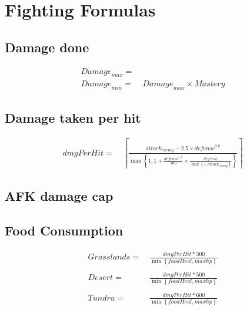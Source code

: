     \newpage
    \section{Fighting Formulas}
        \subsection{Damage done}
            \begin{align*}
                {Damage}_{max} =&\
                \\
                {Damage}_{min} =&\ {Damage}_{max} \times Mastery
            \end{align*}
        \subsection{Damage taken per hit}
            \begin{align*}
                dmgPerHit = &\
                    \left\lceil
                    \frac{ {attack}_{enemy} - 2.5 \times {defense}^{0.8} }
                        { \max \left\{1,1+ \frac{ {defense}^{1.5}}
                            {100} 
                        \times \frac{ {defense} }
                            { {\max \left\{1,{attack}_{enemy} \right\}} }\right\}
                        }
                    \right\rceil
            \end{align*}

        \subsection{AFK damage cap}
            \todo{}
        \subsection{Food Consumption}

            \begin{align*}
                Grasslands = &\ \frac{dmgPerHit * 300}{
                    \min\left\{
                        foodHeal, maxhp
                    \right\} 
                    }
                \\
                \\
                Desert = &\ \frac{dmgPerHit * 500}{
                    \min\left\{
                        foodHeal, maxhp
                    \right\} 
                    }
                \\
                \\
                Tundra = &\ \frac{dmgPerHit * 600}{
                    \min\left\{
                        foodHeal, maxhp
                    \right\} 
                    }
            \end{align*}

